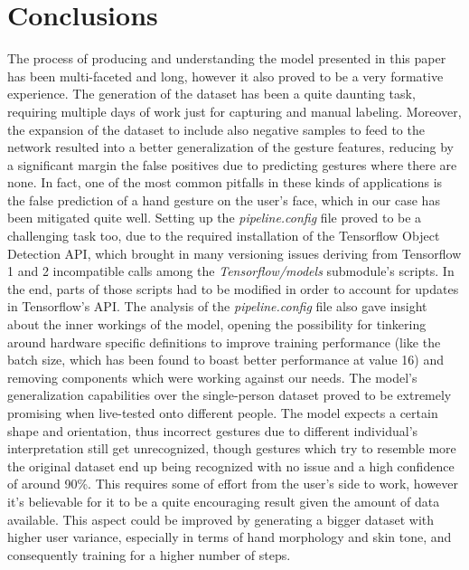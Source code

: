 \documentclass[10pt,twocolumn,letterpaper]{article}
\begin{document}
\section{Conclusions}
\begin{flushleft}
The process of producing and understanding the model presented in this paper has been multi-faceted and long, however it also proved to be a very formative experience.\linebreak
The generation of the dataset has been a quite daunting task, requiring multiple days of work just for capturing and manual labeling. Moreover, the expansion of the dataset to include also negative samples to feed to the network resulted into a better generalization of the gesture features, reducing by a significant margin the false positives due to predicting gestures where there are none. In fact, one of the most common pitfalls in these kinds of applications is the false prediction of a hand gesture on the user's face, which in our case has been mitigated quite well.\linebreak
Setting up the \textit{pipeline.config} file proved to be a challenging task too, due to the required installation of the Tensorflow Object Detection API, which brought in many versioning issues deriving from Tensorflow 1 and 2 incompatible calls among the \textit{Tensorflow/models} submodule's scripts. In the end, parts of those scripts had to be modified in order to account for updates in Tensorflow's API.\linebreak
The analysis of the \textit{pipeline.config} file also gave insight about the inner workings of the model, opening the possibility for tinkering around hardware specific definitions to improve training performance (like the batch size, which has been found to boast better performance at value 16) and removing components which were working against our needs.\linebreak
The model's generalization capabilities over the single-person dataset proved to be extremely promising when live-tested onto different people. The model expects a certain shape and orientation, thus incorrect gestures due to different individual's interpretation still get unrecognized, though gestures which try to resemble more the original dataset end up being recognized with no issue and a high confidence of around 90\%. This requires some of effort from the user's side to work, however it's believable for it to be a quite encouraging result given the amount of data available. This aspect could be improved by generating a bigger dataset with higher user variance, especially in terms of hand morphology and skin tone, and consequently training for a higher number of steps.\linebreak

\end{flushleft}
\end{document}
